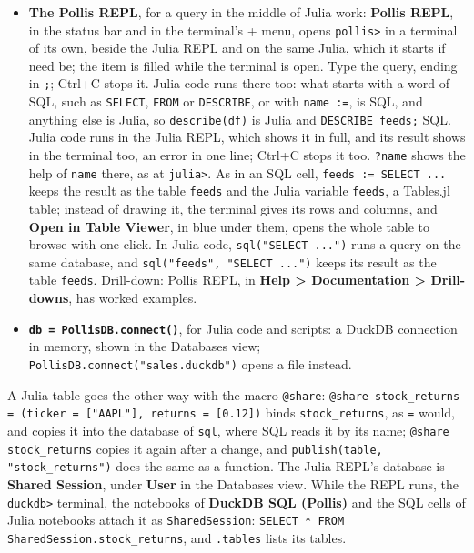 \documentclass[10pt,a4paper,twoside]{article}
\newcommand{\ui}[1]{\textbf{#1}}
\begin{document}
\begin{itemize}
  \item \textbf{The Pollis REPL}, for a query in the middle of Julia work: \ui{Pollis REPL}, in the status bar and in
    the terminal's + menu, opens \texttt{pollis>} in a terminal of its own, beside the Julia REPL and on the same
    Julia, which it starts if need be; the item is filled while the terminal is open. Type the query, ending in
    \texttt{;}; Ctrl+C stops it. Julia code runs there too: what starts with a word of SQL, such as \texttt{SELECT},
    \texttt{FROM} or \texttt{DESCRIBE}, or with \texttt{name :=}, is SQL, and anything else is Julia, so
    \texttt{describe(df)} is Julia and \texttt{DESCRIBE feeds;} SQL. Julia code runs in the Julia REPL, which shows it
    in full, and its result shows in the terminal too, an error in one line; Ctrl+C stops it too. \texttt{?name} shows the help of
    \texttt{name} there, as at \texttt{julia>}. As in an SQL cell,
    \texttt{feeds := SELECT ...} keeps the result as the table \texttt{feeds} and the Julia variable
    \texttt{feeds}, a Tables.jl table; instead of drawing it, the terminal gives its rows and columns, and \ui{Open in
    Table Viewer}, in blue under them, opens the whole table to browse with one click. In Julia code,
    \texttt{sql("SELECT ...")} runs a query on the same database, and \texttt{sql("feeds", "SELECT ...")} keeps its
    result as the table \texttt{feeds}. Drill-down: Pollis REPL, in \ui{Help > Documentation > Drill-downs}, has worked examples.
  \item \textbf{\texttt{db = PollisDB.connect()}}, for Julia code and scripts: a DuckDB connection in
    memory, shown in the Databases view; \texttt{PollisDB.connect("sales.duckdb")} opens a file instead.
\end{itemize}
A Julia table goes the other way with the macro \texttt{@share}: \texttt{@share stock\_returns = (ticker = ["AAPL"],
returns = [0.12])} binds \texttt{stock\_returns}, as \texttt{=} would, and copies it into the database of
\texttt{sql}, where SQL reads it by its name; \texttt{@share stock\_returns} copies it again after a change, and
\texttt{publish(table, "stock\_returns")} does the same as a function. The Julia REPL's database is \ui{Shared Session}, under \ui{User} in the Databases view. While the REPL
runs, the \texttt{duckdb>} terminal, the notebooks of \ui{DuckDB SQL (Pollis)} and the SQL cells of Julia notebooks
attach it as \texttt{SharedSession}: \texttt{SELECT * FROM SharedSession.stock\_returns}, and \texttt{.tables} lists its tables.
\end{document}
